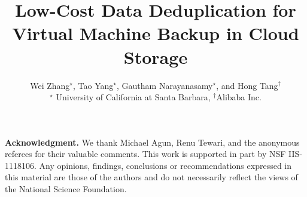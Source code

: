 \documentclass[finalversion]{usetex-v1}
\begin{document}
\title{ Low-Cost Data Deduplication  for  Virtual Machine Backup in Cloud Storage}

\author{
Wei Zhang$^{\star}$, Tao Yang$^\star$, Gautham Narayanasamy$^\star$, and Hong Tang$^\dagger$ \\
{\normalsize$^\star$  University of California at Santa Barbara}, {\normalsize$^\dagger$Alibaba Inc.}
}


\date{}
\maketitle



%
%
%



{\bf Acknowledgment.} We thank Michael Agun, Renu Tewari, and
the anonymous referees for their valuable comments.
This work is supported in part by NSF IIS-1118106. 
Any opinions, findings, conclusions or recommendations expressed in this material
are those of the authors and
do not necessarily reflect the views of the National Science Foundation.




{\small


}
\end{document}
